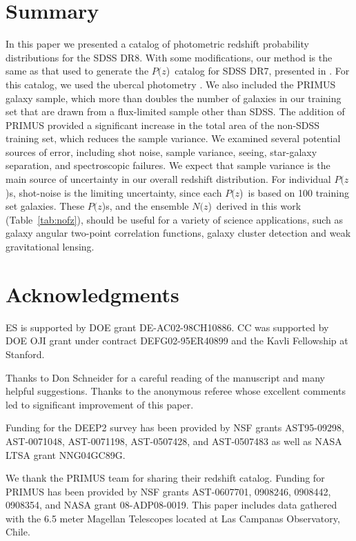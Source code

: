 \documentclass[12pt,preprint]{aastex}
\newcommand{\pofz}{$P(z$)}
\newcommand{\nofz}{$N(z$)}
\begin{document}
\section{Summary} \label{sec:summary}

In this paper we presented a catalog of photometric redshift probability
distributions for the SDSS DR8.  With some modifications, our method is the
same as that used to generate the \pofz\ catalog for SDSS DR7, presented in
\cite{CunhaPhotoz09}.  For this catalog, we used the ubercal photometry
\citep{Nikhil08}.  We also included the PRIMUS galaxy sample, which more than
doubles the number of galaxies in our training set that are drawn from a
flux-limited sample other than SDSS.  The addition of PRIMUS provided a
significant increase in the total area of the non-SDSS training set, which
reduces the sample variance.  We examined several potential sources of error,
including shot noise, sample variance, seeing, star-galaxy separation, and
spectroscopic failures.  We expect that sample variance is the main source of
uncertainty in our overall redshift distribution.  For individual \pofz s,
shot-noise is the limiting uncertainty, since each \pofz\ is based on 100
training set galaxies.  These \pofz s, and the ensemble \nofz\ derived in this
work (Table~\ref{tab:nofz}), should be useful for a variety of science
applications, such as galaxy angular two-point correlation functions, galaxy
cluster detection and weak gravitational lensing.


\section*{Acknowledgments}

ES is supported by DOE grant DE-AC02-98CH10886.  CC was supported by DOE OJI
grant under contract DEFG02-95ER40899 and the Kavli Fellowship at Stanford.

Thanks to Don Schneider for a careful reading of the manuscript and many
helpful suggestions.  Thanks to the anonymous referee whose excellent comments
led to significant improvement of this paper.

Funding for the DEEP2 survey has been provided by NSF grants AST95-09298,
AST-0071048, AST-0071198, AST-0507428, and AST-0507483 as well as NASA LTSA
grant NNG04GC89G. 

We thank the PRIMUS team for sharing their redshift catalog. Funding for PRIMUS
has been provided by NSF grants AST-0607701, 0908246, 0908442, 0908354, and
NASA grant 08-ADP08-0019. This paper includes data gathered with the 6.5 meter
Magellan Telescopes located at Las Campanas Observatory, Chile.
\end{document}
